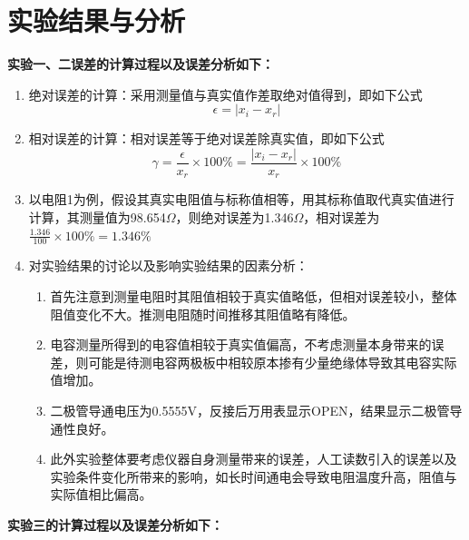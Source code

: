 \documentclass[a4paper]{article}
\begin{document}
\newpage

\section{实验结果与分析}
{\songti{}\bfseries 实验一、二误差的计算过程以及误差分析如下：}\par
\begin{enumerate}
    \item 绝对误差的计算：采用测量值与真实值作差取绝对值得到，即如下公式 $$ \epsilon = |x_i-x_r| $$ 
    \item 相对误差的计算：相对误差等于绝对误差除真实值，即如下公式 $$ \gamma = \frac{\epsilon}{x_r}×100\% = \frac{|x_i-x_r|}{x_r}×100\%  $$
    \item 以电阻1为例，假设其真实电阻值与标称值相等，用其标称值取代真实值进行计算，其测量值为98.654$\Omega $，则绝对误差为1.346$\Omega $，相对误差为 $ \frac{1.346}{100}×100\% = 1.346\% $
    \item 对实验结果的讨论以及影响实验结果的因素分析：\par 
        \begin{enumerate}
            \item 首先注意到测量电阻时其阻值相较于真实值略低，但相对误差较小，整体阻值变化不大。推测电阻随时间推移其阻值略有降低。
            \item 电容测量所得到的电容值相较于真实值偏高，不考虑测量本身带来的误差，则可能是待测电容两极板中相较原本掺有少量绝缘体导致其电容实际值增加。
            \item 二极管导通电压为0.5555V，反接后万用表显示OPEN，结果显示二极管导通性良好。
            \item 此外实验整体要考虑仪器自身测量带来的误差，人工读数引入的误差以及实验条件变化所带来的影响，如长时间通电会导致电阻温度升高，阻值与实际值相比偏高。
        \end{enumerate}
\end{enumerate}
\par
{\songti{}\bfseries 实验三的计算过程以及误差分析如下：}\par
\end{document}

